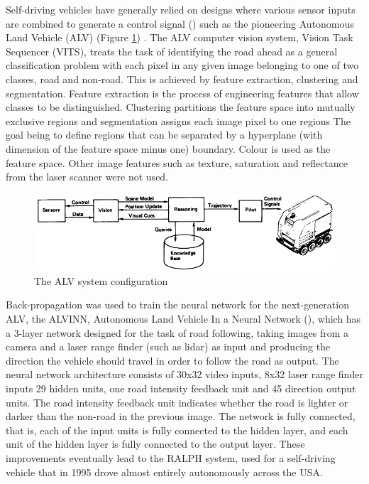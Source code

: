 Self-driving vehicles have generally relied on designs where various sensor inputs are combined to generate a control signal (\cite{3899}) such as the pioneering Autonomous Land Vehicle (ALV) (Figure \ref{fig:alv_system_configuration}) . The ALV computer vision system, Vision Task Sequencer (VITS), treats the task of identifying the road ahead as a general classification problem with each pixel in any given image belonging to one of two classes, road and non-road. This is achieved by feature extraction, clustering and segmentation. Feature extraction is the process of engineering features that allow classes to be distinguished. Clustering partitions the feature space into mutually exclusive regions and segmentation assigns each image pixel to one regions The goal being to define regions that can be separated by a hyperplane (with dimension of the feature space minus one) boundary. Colour is used as the feature space. Other image features such as texture, saturation and reflectance from the laser scanner were not used.
\begin{figure}[ht]
 \centering 
 \includegraphics[width=\columnwidth]{figures/ALV-system-configuration.png}
 \caption{The ALV system configuration}
 \label{fig:alv_system_configuration}
\end{figure}

Back-propagation was used to train the neural network for the next-generation ALV, the ALVINN, Autonomous Land Vehicle In a Neural Network (\cite{NIPS1988_95}),  which has a 3-layer network designed for the task of road following, taking images from a camera and a laser range finder (such as lidar) as input and producing the direction the vehicle should travel in order to follow the road as output. The neural network architecture consists of 30x32 video inputs, 8x32 laser range finder inputs 29 hidden units, one road intensity feedback unit and 45 direction output units. The road intensity feedback unit indicates whether the road is lighter or darker
than the non-road in the previous image. The network is fully connected, that is, each of the input units is fully connected to the hidden layer, and each unit of the hidden layer is fully connected to the output layer.
These improvements eventually lead to the RALPH system, used for a self-driving vehicle that in 1995 drove almost entirely autonomously across the USA.

